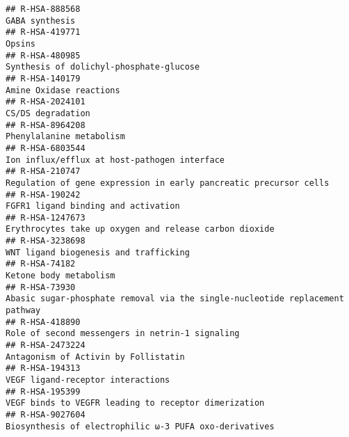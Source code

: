\documentclass[
]{article}
\begin{document}
\begin{verbatim}
## R-HSA-888568                                                                                                                        GABA synthesis
## R-HSA-419771                                                                                                                                Opsins
## R-HSA-480985                                                                                               Synthesis of dolichyl-phosphate-glucose
## R-HSA-140179                                                                                                               Amine Oxidase reactions
## R-HSA-2024101                                                                                                                    CS/DS degradation
## R-HSA-8964208                                                                                                             Phenylalanine metabolism
## R-HSA-6803544                                                                                         Ion influx/efflux at host-pathogen interface
## R-HSA-210747                                                                     Regulation of gene expression in early pancreatic precursor cells
## R-HSA-190242                                                                                                   FGFR1 ligand binding and activation
## R-HSA-1247673                                                                               Erythrocytes take up oxygen and release carbon dioxide
## R-HSA-3238698                                                                                                WNT ligand biogenesis and trafficking
## R-HSA-74182                                                                                                                 Ketone body metabolism
## R-HSA-73930                                                           Abasic sugar-phosphate removal via the single-nucleotide replacement pathway
## R-HSA-418890                                                                                       Role of second messengers in netrin-1 signaling
## R-HSA-2473224                                                                                                 Antagonism of Activin by Follistatin
## R-HSA-194313                                                                                                     VEGF ligand-receptor interactions
## R-HSA-195399                                                                                  VEGF binds to VEGFR leading to receptor dimerization
## R-HSA-9027604                                                                               Biosynthesis of electrophilic ω-3 PUFA oxo-derivatives

\end{verbatim}
\end{document}
